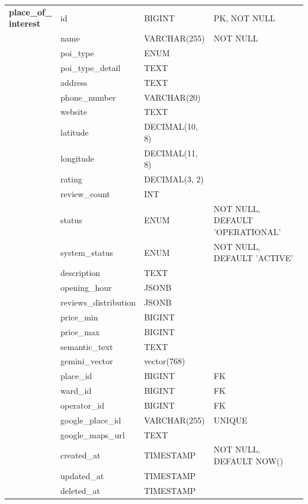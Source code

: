 {\begin{longtable}{|p{2.5cm}|p{3.8cm}|p{3.8cm}|p{4.2cm}|}
\textbf{place\_of\_\newline interest} 
    & id & BIGINT & PK, NOT NULL \\ \cline{2-4} 
    & name & VARCHAR(255) & NOT NULL \\ \cline{2-4} 
    & poi\_type & ENUM & \\ \cline{2-4}
    & poi\_type\_detail & TEXT & \\ \cline{2-4}
    & address & TEXT & \\ \cline{2-4} 
    & phone\_number & VARCHAR(20) & \\ \cline{2-4}
    & website & TEXT & \\ \cline{2-4} 
    & latitude & DECIMAL(10, 8) & \\ \cline{2-4} 
    & longitude & DECIMAL(11, 8) & \\ \cline{2-4} 
    & rating & DECIMAL(3, 2) & \\ \cline{2-4}
    & review\_count & INT & \\ \cline{2-4}
    & status & ENUM & NOT NULL, DEFAULT 'OPERATIONAL' \\ \cline{2-4} 
    & system\_status & ENUM & NOT NULL, DEFAULT 'ACTIVE' \\ \cline{2-4}
    & description & TEXT & \\ \cline{2-4} 
    & opening\_hour & JSONB & \\ \cline{2-4} 
    & reviews\_distribution & JSONB & \\ \cline{2-4}
    & price\_min & BIGINT & \\ \cline{2-4}
    & price\_max & BIGINT & \\ \cline{2-4}
    & semantic\_text & TEXT & \\ \cline{2-4}
    & gemini\_vector & vector(768) & \\ \cline{2-4}
    & place\_id & BIGINT & FK \\ \cline{2-4} 
    & ward\_id & BIGINT & FK \\ \cline{2-4}
    & operator\_id & BIGINT & FK \\ \cline{2-4} 
    & google\_place\_id & VARCHAR(255) & UNIQUE \\ \cline{2-4}
    & google\_maps\_url & TEXT & \\ \cline{2-4}
    & created\_at & TIMESTAMP & NOT NULL, DEFAULT NOW() \\ \cline{2-4}
    & updated\_at & TIMESTAMP & \\ \cline{2-4}
    & deleted\_at & TIMESTAMP & \\ \hline


\end{longtable}}
